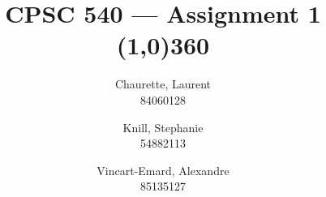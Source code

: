 \documentclass[11pt, oneside]{article}   	%
\theoremstyle{definition}
\theoremstyle{remark}
\begin{document}
\title{CPSC 540 --- Assignment 1 \\
\line(1,0){360} \\				%
\vspace{0.5cm}
}

\author{
Chaurette, Laurent\\
84060128
\and
Knill, Stephanie\\
54882113
\and
Vincart-Emard, Alexandre\\
85135127
}
\date{}
\maketitle





\end{document}
